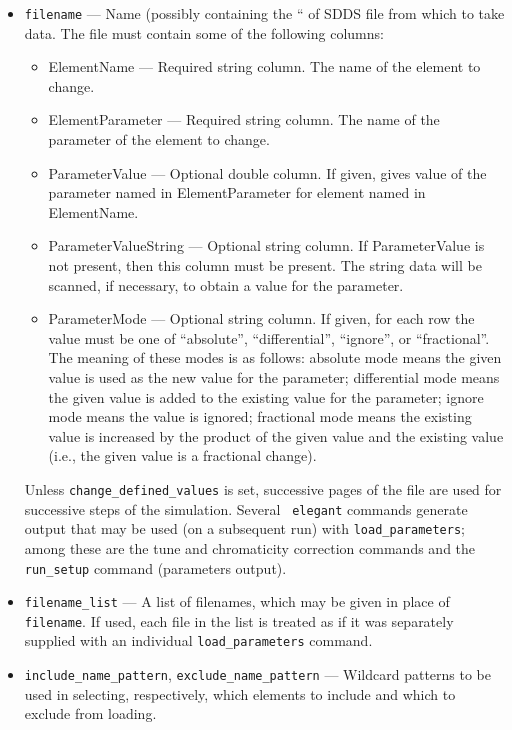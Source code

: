 \documentclass[11pt]{article}
\begin{document}
\begin{itemize}
\item \verb|filename| --- Name (possibly containing the ``%
of SDDS file from which to take data.  The file
must contain some of the following columns:
\begin{itemize}
\item ElementName --- Required string column.  The name of the element to change.
\item ElementParameter --- Required string column.  The name of the parameter of the element to change.
\item ParameterValue --- Optional double column.  If given, gives value of the parameter named
 in ElementParameter for element named in ElementName.
\item ParameterValueString --- Optional string column.  If ParameterValue is not present, then
this column must be present.  The string data will be scanned, if necessary,
to obtain a value for the parameter.
\item ParameterMode --- Optional string column.  If given, for each row the value must be
one of ``absolute'', ``differential'', ``ignore'', or ``fractional''.  The meaning of these
modes is as follows: absolute mode means the given value is used as the new value for
the parameter; differential mode means the given value is added to the existing value
for the parameter; ignore mode means the value is ignored; fractional mode means the
existing value is increased by the product of the given value and the existing value 
(i.e., the given value is a fractional change).
\end{itemize}

Unless \verb|change_defined_values| is set, successive pages of the
file are used for successive steps of the simulation.  Several {\tt
elegant} commands generate output that may be used (on a subsequent
run) with \verb|load_parameters|; among these are the tune and
chromaticity correction commands and the \verb|run_setup| command
(parameters output).

\item \verb|filename_list| --- A list of filenames, which may be 
        given in place of \verb|filename|.  If used, each file
        in the list is treated as if it was separately supplied
        with an individual \verb|load_parameters| command.

\item \verb|include_name_pattern|, \verb|exclude_name_pattern| ---
Wildcard patterns to be used in selecting, respectively, which
elements to include and which to exclude from loading.


\end{itemize}
\end{document}
